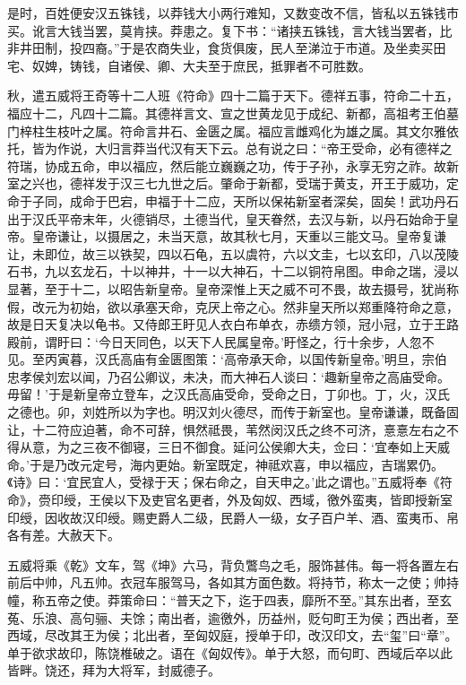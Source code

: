 \documentclass[12pt,UTF8]{ctexbook}
\begin{document}
是时，百姓便安汉五铢钱，以莽钱大小两行难知，又数变改不信，皆私以五铢钱市买。讹言大钱当罢，莫肯挟。莽患之。复下书：“诸挟五铢钱，言大钱当罢者，比非井田制，投四裔。”于是农商失业，食货俱废，民人至涕泣于市道。及坐卖买田宅、奴婢，铸钱，自诸侯、卿、大夫至于庶民，抵罪者不可胜数。



秋，遣五威将王奇等十二人班《符命》四十二篇于天下。德祥五事，符命二十五，福应十二，凡四十二篇。其德祥言文、宣之世黄龙见于成纪、新都，高祖考王伯墓门梓柱生枝叶之属。符命言井石、金匮之属。福应言雌鸡化为雄之属。其文尔雅依托，皆为作说，大归言莽当代汉有天下云。总有说之曰：“帝王受命，必有德祥之符瑞，协成五命，申以福应，然后能立巍巍之功，传于子孙，永享无穷之祚。故新室之兴也，德祥发于汉三七九世之后。肇命于新都，受瑞于黄支，开王于威功，定命于子同，成命于巴宕，申福于十二应，天所以保祐新室者深矣，固矣！武功丹石出于汉氏平帝末年，火德销尽，土德当代，皇天眷然，去汉与新，以丹石始命于皇帝。皇帝谦让，以摄居之，未当天意，故其秋七月，天重以三能文马。皇帝复谦让，未即位，故三以铁契，四以石龟，五以虞符，六以文圭，七以玄印，八以茂陵石书，九以玄龙石，十以神井，十一以大神石，十二以铜符帛图。申命之瑞，浸以显著，至于十二，以昭告新皇帝。皇帝深惟上天之威不可不畏，故去摄号，犹尚称假，改元为初始，欲以承塞天命，克厌上帝之心。然非皇天所以郑重降符命之意，故是日天复决以龟书。又侍郎王盱见人衣白布单衣，赤缋方领，冠小冠，立于王路殿前，谓盱曰：‘今日天同色，以天下人民属皇帝。’盱怪之，行十余步，人忽不见。至丙寅暮，汉氏高庙有金匮图策：‘高帝承天命，以国传新皇帝。’明旦，宗伯忠孝侯刘宏以闻，乃召公卿议，未决，而大神石人谈曰：‘趣新皇帝之高庙受命。毋留！’于是新皇帝立登车，之汉氏高庙受命，受命之日，丁卯也。丁，火，汉氏之德也。卯，刘姓所以为字也。明汉刘火德尽，而传于新室也。皇帝谦谦，既备固让，十二符应迫著，命不可辞，惧然祗畏，苇然闵汉氏之终不可济，憙憙左右之不得从意，为之三夜不御寝，三日不御食。延问公侯卿大夫，佥曰：‘宜奉如上天威命。’于是乃改元定号，海内更始。新室既定，神祗欢喜，申以福应，吉瑞累仍。《诗》曰：‘宜民宜人，受禄于天；保右命之，自天申之。’此之谓也。”五威将奉《符命》，赍印绶，王侯以下及吏官名更者，外及匈奴、西域，徼外蛮夷，皆即授新室印绶，因收故汉印绶。赐吏爵人二级，民爵人一级，女子百户羊、酒、蛮夷币、帛各有差。大赦天下。



五威将乘《乾》文车，驾《坤》六马，背负鷩鸟之毛，服饰甚伟。每一将各置左右前后中帅，凡五帅。衣冠车服驾马，各如其方面色数。将持节，称太一之使；帅持幢，称五帝之使。莽策命曰：“普天之下，迄于四表，靡所不至。”其东出者，至玄菟、乐浪、高句骊、夫馀；南出者，逾徼外，历益州，贬句町王为侯；西出者，至西域，尽改其王为侯；北出者，至匈奴庭，授单于印，改汉印文，去“玺”曰“章”。单于欲求故印，陈饶椎破之。语在《匈奴传》。单于大怒，而句町、西域后卒以此皆畔。饶还，拜为大将军，封威德子。
\end{document}
